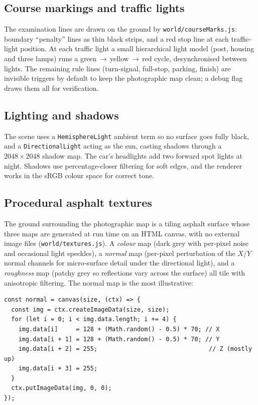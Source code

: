 \documentclass[11pt]{article}
\newcommand{\code}[1]{\texttt{#1}}
\begin{document}
\subsection{Course markings and traffic lights}

The examination lines are drawn on the ground by \code{world/courseMarks.js}:
boundary ``penalty'' lines as thin black strips, and a red stop line at each
traffic-light position. At each traffic light a small hierarchical light model
(post, housing and three lamps) runs a green\,$\to$\,yellow\,$\to$\,red cycle,
desynchronised between lights. The remaining rule lines (turn-signal, full-stop,
parking, finish) are invisible triggers by default to keep the photographic map
clean; a debug flag draws them all for verification.

\subsection{Lighting and shadows}

The scene uses a \code{HemisphereLight} ambient term so no surface goes fully
black, and a \code{DirectionalLight} acting as the sun, casting shadows through a
$2048\times2048$ shadow map. The car's headlights add two forward spot lights at
night. Shadows use percentage-closer filtering for soft edges, and the renderer
works in the sRGB colour space for correct tone.

\subsection{Procedural asphalt textures}

The ground surrounding the photographic map is a tiling asphalt surface whose
three maps are generated at run time on an HTML canvas, with no external image
files (\code{world/textures.js}). A \emph{colour} map (dark grey with per-pixel
noise and occasional light speckles), a \emph{normal} map (per-pixel perturbation
of the $X$/$Y$ normal channels for micro-surface detail under the directional
light), and a \emph{roughness} map (patchy grey so reflections vary across the
surface) all tile with anisotropic filtering. The normal map is the most
illustrative:

\begin{lstlisting}[caption={Procedural normal map (\code{textures.js}).}]
const normal = canvas(size, (ctx) => {
  const img = ctx.createImageData(size, size);
  for (let i = 0; i < img.data.length; i += 4) {
    img.data[i]     = 128 + (Math.random() - 0.5) * 70; // X
    img.data[i + 1] = 128 + (Math.random() - 0.5) * 70; // Y
    img.data[i + 2] = 255;                               // Z (mostly up)
    img.data[i + 3] = 255;
  }
  ctx.putImageData(img, 0, 0);
});
\end{lstlisting}
\end{document}
